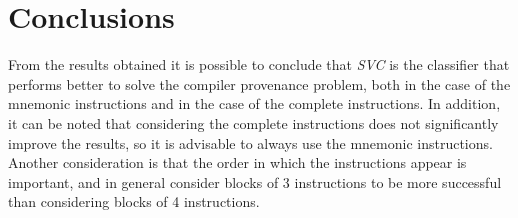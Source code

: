 \documentclass[11pt]{article}
\begin{document}
\section{Conclusions}
From the results obtained it is possible to conclude that \textit{SVC} is the classifier that performs better to solve the compiler provenance problem, both in the case of the mnemonic instructions and in the case of the complete instructions. In addition, it can be noted that considering the complete instructions does not significantly improve the results, so it is advisable to always use the mnemonic instructions. Another consideration is that the order in which the instructions appear is important, and in general consider blocks of 3 instructions to be more successful than considering blocks of 4 instructions.
\end{document}
